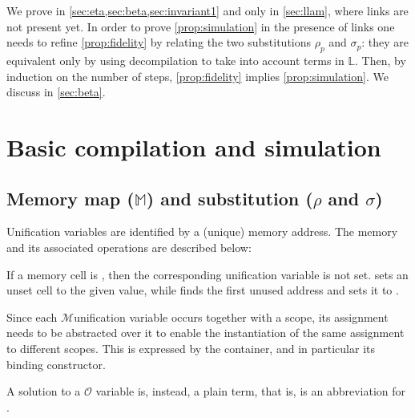 \documentclass[sigconf,natbib=false,review]{acmart}
\newcommand{\Fo}{\texorpdfstring{\ensuremath{\mathcal{O}}\xspace}{O}}
\newcommand{\Ho}{\texorpdfstring{\ensuremath{\mathcal{M}}\xspace}{M}}
\newcommand{\linkStore}{\texorpdfstring{\ensuremath{\mathbb{L}}\xspace}{L}}
\newcommand{\mapStore}{\texorpdfstring{\ensuremath{\mathbb{M}}\xspace}{M}}
\begin{document}
We prove  in
\cref{sec:eta,sec:beta,sec:invariant1}
and  only in \cref{sec:llam},
where links are not present yet.
In order to prove \cref{prop:simulation} in the presence of links
one needs to refine \cref{prop:fidelity} by relating the two
substitutions $\rho_p$ and $\sigma_p$: they are equivalent only by using decompilation to 
take into account terms in \linkStore.
Then, by induction
on the number of steps, \cref{prop:fidelity} implies \cref{prop:simulation}.
We discuss  in \cref{sec:beta}.


\section{Basic compilation and simulation}
\label{sec:simulation}


\subsection{Memory map (\mapStore) and substitution (\texorpdfstring{$\rho$ and $\sigma$}{rho and sigma})}
\label{sec:grounwork}


% 

Unification variables are identified by a (unique) memory address.
The memory and its associated operations are described below:



\noindent
If a memory cell is , then the corresponding unification variable
is not set.  sets an unset cell to the given value, while
 finds the first unused address and sets it to .

Since each \Ho unification variable occurs together with a scope,
its assignment needs to be abstracted over it to enable the
instantiation of the same assignment to different scopes.
This is expressed by the  container, and in particular
its  binding constructor.



\noindent
A solution to a \Fo{} variable is, instead, a plain term, that is, 
is an abbreviation for .
\end{document}

